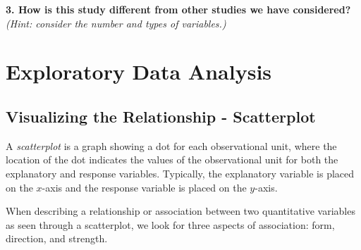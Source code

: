 \documentclass[
  letterpaper,
  DIV=11,
  numbers=noendperiod]{scrartcl}
\begin{document}

\vspace{1cm}

\textbf{3. How is this study different from other studies we have
considered?} \emph{(Hint: consider the number and types of variables.)}


\vspace{.5in}

\hypertarget{exploratory-data-analysis}{%
\section{Exploratory Data Analysis}\label{exploratory-data-analysis}}

\hypertarget{visualizing-the-relationship---scatterplot}{%
\subsection{Visualizing the Relationship -
Scatterplot}\label{visualizing-the-relationship---scatterplot}}

A \emph{scatterplot} is a graph showing a dot for each observational
unit, where the location of the dot indicates the values of the
observational unit for both the explanatory and response variables.
Typically, the explanatory variable is placed on the \(x\)-axis and the
response variable is placed on the \(y\)-axis.

When describing a relationship or association between two quantitative
variables as seen through a scatterplot, we look for three aspects of
association: form, direction, and strength.
\end{document}
